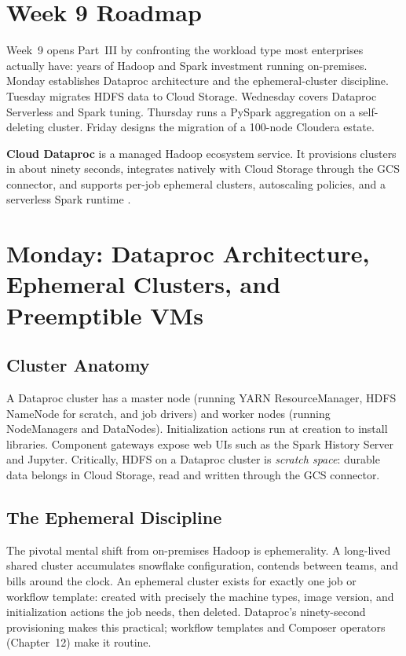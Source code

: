 \section{Week 9 Roadmap}
Week~9 opens Part~III by confronting the workload type most enterprises actually have: years of Hadoop and Spark investment running on-premises. Monday establishes Dataproc architecture and the ephemeral-cluster discipline. Tuesday migrates HDFS data to Cloud Storage. Wednesday covers Dataproc Serverless and Spark tuning. Thursday runs a PySpark aggregation on a self-deleting cluster. Friday designs the migration of a 100-node Cloudera estate.

\begin{definitionbox}
\textbf{Cloud Dataproc} is a managed Hadoop ecosystem service. It provisions clusters in about ninety seconds, integrates natively with Cloud Storage through the GCS connector, and supports per-job ephemeral clusters, autoscaling policies, and a serverless Spark runtime \cite{googleclouddataprocdocs}.
\end{definitionbox}

\section{Monday: Dataproc Architecture, Ephemeral Clusters, and Preemptible VMs}

\subsection{Cluster Anatomy}
A Dataproc cluster has a master node (running YARN ResourceManager, HDFS NameNode for scratch, and job drivers) and worker nodes (running NodeManagers and DataNodes). Initialization actions run at creation to install libraries. Component gateways expose web UIs such as the Spark History Server and Jupyter. Critically, HDFS on a Dataproc cluster is \emph{scratch space}: durable data belongs in Cloud Storage, read and written through the GCS connector.

\subsection{The Ephemeral Discipline}
The pivotal mental shift from on-premises Hadoop is ephemerality. A long-lived shared cluster accumulates snowflake configuration, contends between teams, and bills around the clock. An ephemeral cluster exists for exactly one job or workflow template: created with precisely the machine types, image version, and initialization actions the job needs, then deleted. Dataproc's ninety-second provisioning makes this practical; workflow templates and Composer operators (Chapter~12) make it routine.

